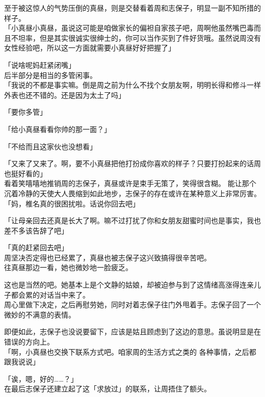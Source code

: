 至于被这惊人的气势压倒的真昼，则是交替看着周和志保子，明显一副不知所措的样子。\\

「小真昼小真昼，虽说这可能是咱做家长的偏袒自家孩子吧，周啊他虽然嘴巴毒而且不坦率，但是其实很诚实很绅士的，你可以当作买到了件好货哦。虽然说周没有女性经验吧，所以这一方面就需要小真昼好好把握了」

「说啥呢妈赶紧闭嘴」\\

后半部分是相当的多管闲事。\\

「我说的不都是事实嘛。倒是周之前为什么不找个女朋友啊，明明长得和修斗一样外表也还不错的。还是因为太土了吗」

「要你多管」

「给小真昼看看你帅的那一面？」

「不给而且这家伙也没想看」

「又来了又来了。啊，要不小真昼把他打扮成你喜欢的样子？只要打扮起来的话周也挺好看的」\\

看着笑嘻嘻地推销周的志保子，真昼或许是束手无策了，笑得很含糊。
能让那个沉着冷静的天使大人畏缩到如此地步，志保子的存在或许在某种意义上非常厉害。\\

「妈，椎名真的很困扰啦。话说你回去吧」

「让母亲回去还真是长大了啊。嘛不过打扰了你和女朋友甜蜜时间也是事实，我也差不多该告辞了吧」

「真的赶紧回去吧」\\

周坚决否定得也已经累了，真昼也被志保子这兴致搞得很辛苦吧。\\

往真昼那边一看，她也微妙地一脸疲乏。

这也是当然的吧。她基本上是个文静的姑娘，却被迫参与到了这情绪高涨得连亲儿子都会累的对话当中来了。\\

周心里做下决定，之后再慰劳她，同时对着志保子往门外甩着手。志保子回了一个微妙的不满意的表情。

即便如此，志保子也没说要留下，应该是姑且顾虑到了这边的意思。虽说明显是在错误的方向上。\\

「啊，小真昼也交换下联系方式吧。咱家周的生活方式之类的 各种事情，之后都跟我说说」

「诶，嗯，好的……？」\\

在最后志保子还建立起了这「求放过」的联系，让周捂住了额头。\\

